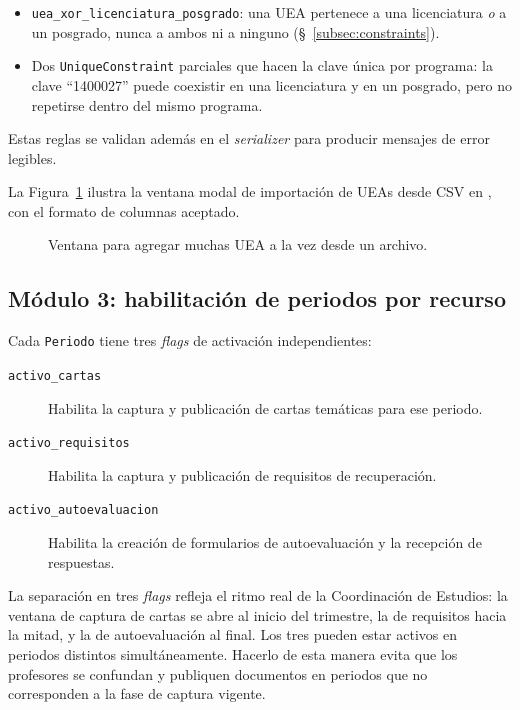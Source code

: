 \begin{itemize}
    \item \texttt{uea\_xor\_licenciatura\_posgrado}: una UEA pertenece a una licenciatura \emph{o} a un posgrado, nunca a ambos ni a ninguno (\S~\ref{subsec:constraints}).
    \item Dos \texttt{UniqueConstraint} parciales que hacen la clave única por programa: la clave ``1400027'' puede coexistir en una licenciatura y en un posgrado, pero no repetirse dentro del mismo programa.
\end{itemize}

Estas reglas se validan además en el \emph{serializer} para producir mensajes de error legibles.

La Figura~\ref{fig:admin_uea} ilustra la ventana modal de importación de UEAs desde CSV en , con el formato de columnas aceptado.

\begin{figure}[!htbp]
    \centering
    \caption{Ventana para agregar muchas UEA a la vez desde un archivo.}
    \label{fig:admin_uea}
\end{figure}

\subsection{Módulo 3: habilitación de periodos por recurso}

Cada \texttt{Periodo} tiene tres \emph{flags} de activación independientes:

\begin{description}
    \item[\texttt{activo\_cartas}] Habilita la captura y publicación de cartas temáticas para ese periodo.
    \item[\texttt{activo\_requisitos}] Habilita la captura y publicación de requisitos de recuperación.
    \item[\texttt{activo\_autoevaluacion}] Habilita la creación de formularios de autoevaluación y la recepción de respuestas.
\end{description}

La separación en tres \emph{flags} refleja el ritmo real de la Coordinación de Estudios: la ventana de captura de cartas se abre al inicio del trimestre, la de requisitos hacia la mitad, y la de autoevaluación al final. Los tres pueden estar activos en periodos distintos simultáneamente. Hacerlo de esta manera evita que los profesores se confundan y publiquen documentos en periodos que no corresponden a la fase de captura vigente.

